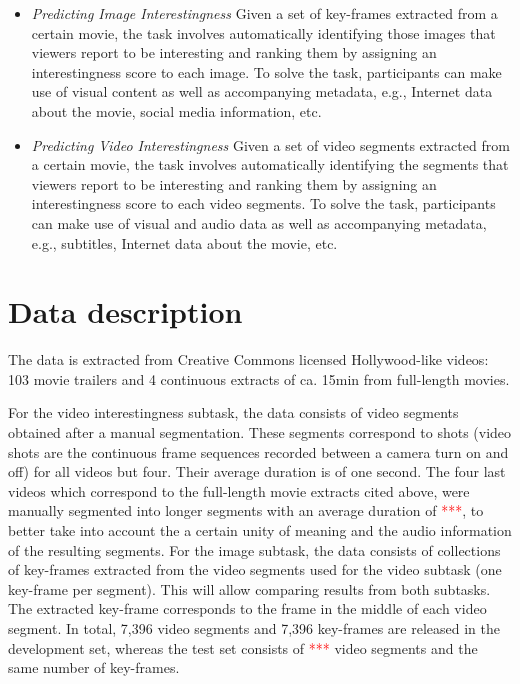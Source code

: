 \documentclass[sigconf]{acmart-me}
\begin{document}
\begin{itemize}
\item \emph{Predicting Image Interestingness} Given a set of key-frames extracted from a certain movie, the task involves automatically identifying those images that viewers report to be interesting and ranking them by assigning an interestingness score to each image. To solve the task, participants can make use of visual content as well as accompanying metadata, e.g., Internet data about the movie, social media information, etc.
\item \emph{Predicting Video Interestingness} Given a set of video segments extracted from a certain movie, the task involves automatically identifying the segments that viewers report to be interesting and ranking them by assigning an interestingness score to each video segments. To solve the task, participants can make use of visual and audio data as well as accompanying metadata, e.g., subtitles, Internet data about the movie, etc.
\end{itemize}


\section{Data description}

The data is extracted from Creative Commons licensed Hollywood-like videos: 103 movie trailers and 4 continuous extracts of ca. 15min from full-length movies. 

For the video interestingness subtask, the data consists of video segments obtained after a manual segmentation. These segments correspond to shots (video shots are the continuous frame sequences recorded between a camera turn on and off) for all videos but four. Their average duration is of one second. The four last videos which correspond to the full-length movie extracts cited above, were manually segmented into longer segments with an average duration of \textcolor{red}{***}, to better take into account the a certain unity of meaning and the audio information of the resulting segments. For the image subtask, the data consists of collections of key-frames extracted from the video segments used for the video subtask (one key-frame per segment). This will allow comparing results from both subtasks. The extracted key-frame corresponds to the frame in the middle of each video segment.
In total, 7,396 video segments and 7,396 key-frames are released in the development set, whereas the test set consists of \textcolor{red}{***} video segments and the same number of key-frames.
\end{document}
